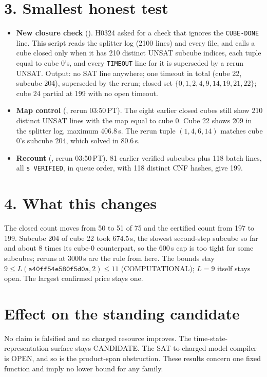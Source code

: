 \documentclass[11pt]{article}
\begin{document}
\section*{3. Smallest honest test}
\begin{itemize}
\item \textbf{New closure check} (). H0324 asked for a check that ignores the \texttt{CUBE-DONE} line. This script reads the splitter log (2100 lines) and every  file, and calls a cube closed only when it has 210 distinct UNSAT subcube indices, each tuple equal to cube 0's, and every \texttt{TIMEOUT} line for it is superseded by a rerun UNSAT. Output: no SAT line anywhere; one timeout in total (cube 22, subcube 204), superseded by the rerun; closed set $\{0,1,2,4,9,14,19,21,22\}$; cube 24 partial at 199 with no open timeout.
\item \textbf{Map control} (, rerun 03:50\,PT). The eight earlier closed cubes still show 210 distinct UNSAT lines with the map equal to cube 0. Cube 22 shows 209 in the splitter log, maximum 406.8\,s. The rerun tuple $(1,4,6,14)$ matches cube 0's subcube 204, which solved in 80.6\,s.
\item \textbf{Recount} (, rerun 03:50\,PT). 81 earlier verified subcubes plus 118 batch lines, all \texttt{s VERIFIED}, in queue order, with 118 distinct CNF hashes, give 199.
\end{itemize}

\section*{4. What this changes}
The closed count moves from 50 to 51 of 75 and the certified count from 197 to 199. Subcube 204 of cube 22 took 674.5\,s, the slowest second-step subcube so far and about 8 times its cube-0 counterpart, so the 600\,s cap is too tight for some subcubes; reruns at 3000\,s are the rule from here. The bounds stay $9\le L(\texttt{a40ff54e580f5d0a},2)\le 11$ (COMPUTATIONAL); $L=9$ itself stays open. The largest confirmed price stays one.

\section*{Effect on the standing candidate}
No claim is falsified and no charged resource improves. The time-state-representation surface stays CANDIDATE. The SAT-to-charged-model compiler is OPEN, and so is the product-span obstruction. These results concern one fixed function and imply no lower bound for any family.
\end{document}
